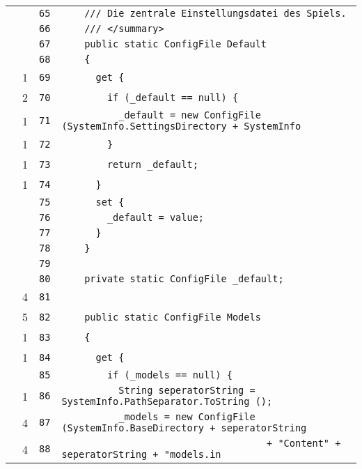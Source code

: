 \documentclass[a4paper,10pt]{article}
\begin{document}
\begin{longtable}[l]{lrrl}
\cellcolor{gray} &  & \verb~65~ & \verb~    /// Die zentrale Einstellungsdatei des Spiels.~\\
\cellcolor{gray} &  & \verb~66~ & \verb~    /// </summary>~\\
\cellcolor{gray} &  & \verb~67~ & \verb~    public static ConfigFile Default~\\
\cellcolor{gray} &  & \verb~68~ & \verb~    {~\\
\cellcolor{green} & 1 & \verb~69~ & \verb~      get {~\\
\cellcolor{green} & 2 & \verb~70~ & \verb~        if (_default == null) {~\\
\cellcolor{green} & 1 & \verb~71~ & \verb~          _default = new ConfigFile (SystemInfo.SettingsDirectory + SystemInfo~\\
\cellcolor{green} & 1 & \verb~72~ & \verb~        }~\\
\cellcolor{green} & 1 & \verb~73~ & \verb~        return _default;~\\
\cellcolor{green} & 1 & \verb~74~ & \verb~      }~\\
\cellcolor{gray} &  & \verb~75~ & \verb~      set {~\\
\cellcolor{gray} &  & \verb~76~ & \verb~        _default = value;~\\
\cellcolor{gray} &  & \verb~77~ & \verb~      }~\\
\cellcolor{gray} &  & \verb~78~ & \verb~    }~\\
\cellcolor{gray} &  & \verb~79~ & \verb~~\\
\cellcolor{gray} &  & \verb~80~ & \verb~    private static ConfigFile _default;~\\
\cellcolor{green} & 4 & \verb~81~ & \verb~~\\
\cellcolor{green} & 5 & \verb~82~ & \verb~    public static ConfigFile Models~\\
\cellcolor{green} & 1 & \verb~83~ & \verb~    {~\\
\cellcolor{green} & 1 & \verb~84~ & \verb~      get {~\\
\cellcolor{gray} &  & \verb~85~ & \verb~        if (_models == null) {~\\
\cellcolor{green} & 1 & \verb~86~ & \verb~          String seperatorString = SystemInfo.PathSeparator.ToString ();~\\
\cellcolor{green} & 4 & \verb~87~ & \verb~          _models = new ConfigFile (SystemInfo.BaseDirectory + seperatorString~\\
\cellcolor{green} & 4 & \verb~88~ & \verb~                                    + "Content" + seperatorString + "models.in~\\

\end{longtable}
\end{document}
